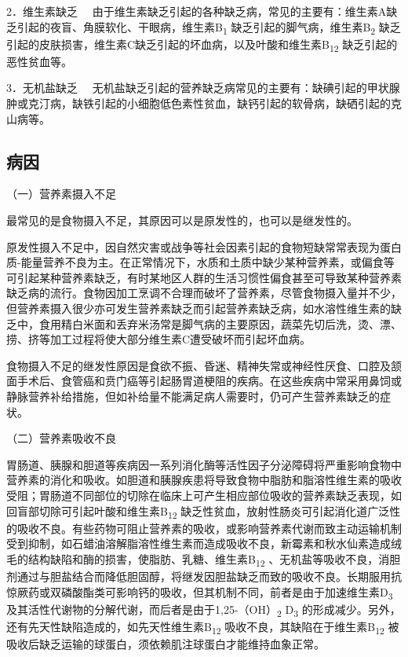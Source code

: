 {2．维生素缺乏}
　由于维生素缺乏引起的各种缺乏病，常见的主要有：维生素A缺乏引起的夜盲、角膜软化、干眼病，维生素B\textsubscript{1}
缺乏引起的脚气病，维生素B\textsubscript{2}
缺乏引起的皮肤损害，维生素C缺乏引起的坏血病，以及叶酸和维生素B\textsubscript{12}
缺乏引起的恶性贫血等。

{3．无机盐缺乏}
　无机盐缺乏引起的营养缺乏病常见的主要有：缺碘引起的甲状腺肿或克汀病，缺铁引起的小细胞低色素性贫血，缺钙引起的软骨病，缺硒引起的克山病等。

\hypertarget{text00003.htmlux5cux23mllj5}{%
\subsection{病因}\label{text00003.htmlux5cux23mllj5}}

（一）营养素摄入不足

最常见的是食物摄入不足，其原因可以是原发性的，也可以是继发性的。

原发性摄入不足中，因自然灾害或战争等社会因素引起的食物短缺常常表现为蛋白质-能量营养不良为主。在正常情况下，水质和土质中缺少某种营养素，或偏食等可引起某种营养素缺乏，有时某地区人群的生活习惯性偏食甚至可导致某种营养素缺乏病的流行。食物因加工烹调不合理而破坏了营养素，尽管食物摄入量并不少，但营养素摄入很少亦可发生营养素缺乏而引起营养素缺乏病，如水溶性维生素的缺乏中，食用精白米面和丢弃米汤常是脚气病的主要原因，蔬菜先切后洗，烫、漂、捞、挤等加工过程将使大部分维生素C遭受破坏而引起坏血病。

食物摄入不足的继发性原因是食欲不振、昏迷、精神失常或神经性厌食、口腔及颔面手术后、食管癌和贲门癌等引起肠胃道梗阻的疾病。在这些疾病中常采用鼻饲或静脉营养补给措施，但如补给量不能满足病人需要时，仍可产生营养素缺乏的症状。

（二）营养素吸收不良

胃肠道、胰腺和胆道等疾病因一系列消化酶等活性因子分泌障碍将严重影响食物中营养素的消化和吸收。如胆道和胰腺疾患将导致食物中脂肪和脂溶性维生素的吸收受阻；胃肠道不同部位的切除在临床上可产生相应部位吸收的营养素缺乏表现，如回盲部切除可引起叶酸和维生素B\textsubscript{12}
缺乏性贫血，放射性肠炎可引起消化道广泛性的吸收不良。有些药物可阻止营养素的吸收，或影响营养素代谢而致主动运输机制受到抑制，如石蜡油溶解脂溶性维生素而造成吸收不良，新霉素和秋水仙素造成绒毛的结构缺陷和酶的损害，使脂肪、乳糖、维生素B\textsubscript{12}
、无机盐等吸收不良，消胆剂通过与胆盐结合而降低胆固醇，将继发因胆盐缺乏而致的吸收不良。长期服用抗惊厥药或双磷酸酯类可影响钙的吸收，但其机制不同，前者是由于加速维生素D\textsubscript{3}
及其活性代谢物的分解代谢，而后者是由于1,25-（OH）\textsubscript{2}
D\textsubscript{3}
的形成减少。另外，还有先天性缺陷造成的，如先天性维生素B\textsubscript{12}
吸收不良，其缺陷在于维生素B\textsubscript{12}
被吸收后缺乏运输的球蛋白，须依赖肌注球蛋白才能维持血象正常。

